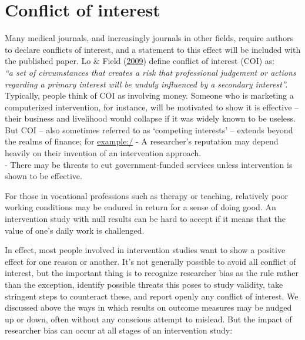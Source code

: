 \documentclass{krantz}
\begin{document}
\hypertarget{conflict-of-interest}{%
\section{Conflict of interest}\label{conflict-of-interest}}

Many medical journals, and increasingly journals in other fields, require authors to declare conflicts of interest, and a statement to this effect will be included with the published paper. Lo \& Field (\protect\hyperlink{ref-lo2009}{2009}) define conflict of interest (COI) as:\\
\emph{``a set of circumstances that creates a risk that professional judgement or actions regarding a primary interest will be unduly influenced by a secondary interest''.}\\
Typically, people think of COI as involving money. Someone who is marketing a computerized intervention, for instance, will be motivated to show it is effective -- their business and livelihood would collapse if it was widely known to be useless. But COI -- also sometimes referred to as `competing interests' -- extends beyond the realms of finance; for \url{example:/}
- A researcher's reputation may depend heavily on their invention of an intervention approach.\\
- There may be threats to cut government-funded services unless intervention is shown to be effective.

For those in vocational professions such as therapy or teaching, relatively poor working conditions may be endured in return for a sense of doing good. An intervention study with null results can be hard to accept if it means that the value of one's daily work is challenged.

In effect, most people involved in intervention studies want to show a positive effect for one reason or another. It's not generally possible to avoid all conflict of interest, but the important thing is to recognize researcher bias as the rule rather than the exception, identify possible threats this poses to study validity, take stringent steps to counteract these, and report openly any conflict of interest. We discussed above the ways in which results on outcome measures may be nudged up or down, often without any conscious attempt to mislead. But the impact of researcher bias can occur at all stages of an intervention study:
\end{document}
